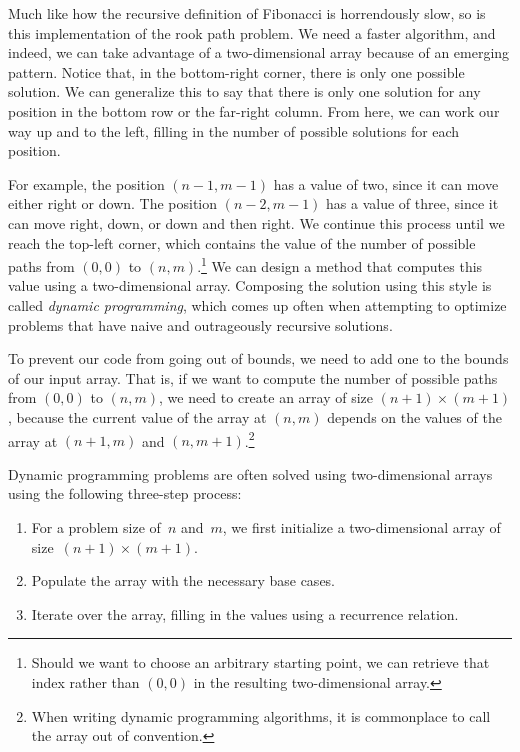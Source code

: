 Much like how the recursive definition of Fibonacci is horrendously slow, so is this implementation of the rook path problem. 
We need a faster algorithm, and indeed, we can take advantage of a two-dimensional array because of an emerging pattern. 
Notice that, in the bottom-right corner, there is only one possible solution. 
We can generalize this to say that there is only one solution for any position in the bottom row or the far-right column. 
From here, we can work our way up and to the left, filling in the number of possible solutions for each position. 

For example, the position $(n - 1, m - 1)$ has a value of two, since it can move either right or down. 
The position $(n - 2, m - 1)$ has a value of three, since it can move right, down, or down and then right. 
We continue this process until we reach the top-left corner, which contains the value of the number of possible paths from $(0, 0)$ to $(n, m)$.\footnote{Should we want to choose an arbitrary starting point, we can retrieve that index rather than $(0, 0)$ in the resulting two-dimensional array.} 
We can design a method that computes this value using a two-dimensional array. 
Composing the solution using this style is called \emph{dynamic programming}, which comes up often when attempting to optimize problems that have naive and outrageously recursive solutions.

To prevent our code from going out of bounds, we need to add one to the bounds of our input array. 
That is, if we want to compute the number of possible paths from $(0, 0)$ to $(n, m)$, we need to create an array of size $(n + 1) \times (m + 1)$, because the current value of the array at $(n, m)$ depends on the values of the array at $(n + 1, m)$ and $(n, m + 1)$.\footnote{When writing dynamic programming algorithms, it is commonplace to call the array  out of convention.} 

Dynamic programming problems are often solved using two-dimensional arrays using the following three-step process: 

\begin{enumerate}
  \item For a problem size of~$n$ and~$m$, we first initialize a two-dimensional array of size~$(n + 1) \times (m + 1)$.
  \item Populate the array with the necessary base cases.
  \item Iterate over the array, filling in the values using a recurrence relation.
\end{enumerate}

